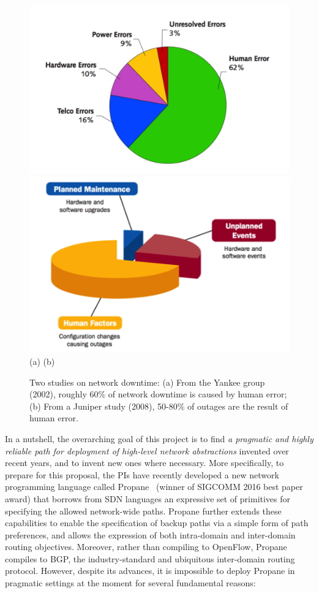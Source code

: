 \begin{figure}[t]
  \centering
  \includegraphics[width=.45\textwidth]{figures/errors1}
  \hspace{1cm}
  \includegraphics[width=.45\textwidth]{figures/errors2} \\
  (a)  \hspace{3in} (b)
  \caption{Two studies on network downtime:  (a) From the Yankee group (2002),
roughly 60\% of network downtime is caused by human error; (b) From a Juniper
study (2008), 50-80\% of outages are the result of human error.}
  \label{fig:network-downtime}
\end{figure}

In a nutshell,
the overarching goal of this project is to find 
\emph{a pragmatic and highly reliable path for deployment of
high-level network abstractions} invented over recent years, and to invent new ones where necessary.
More specifically, to prepare for this proposal, the PIs have recently developed a 
new network programming language called Propane~\cite{beckett+:propane} (winner of SIGCOMM 2016
best paper award) that borrows from SDN languages an expressive set of primitives for specifying the allowed network-wide paths.  Propane further extends these capabilities to enable the specification of backup paths via a simple form of path preferences, and allows the expression of both intra-domain
and inter-domain routing objectives.  Moreover, rather than compiling to OpenFlow,
Propane compiles to BGP, the industry-standard and ubiquitous inter-domain routing protocol. 
However, despite its advances, it is impossible to deploy Propane in pragmatic settings
at the moment for several fundamental reasons:

